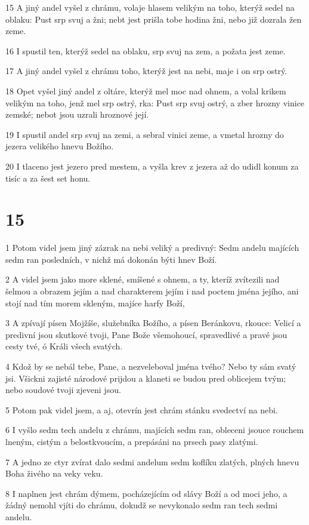 \par 15 A jiný andel vyšel z chrámu, volaje hlasem velikým na toho, kterýž sedel na oblaku: Pust srp svuj a žni; nebt jest prišla tobe hodina žni, nebo již dozrala žen zeme.
\par 16 I spustil ten, kterýž sedel na oblaku, srp svuj na zem, a požata jest zeme.
\par 17 A jiný andel vyšel z chrámu toho, kterýž jest na nebi, maje i on srp ostrý.
\par 18 Opet vyšel jiný andel z oltáre, kterýž mel moc nad ohnem, a volal krikem velikým na toho, jenž mel srp ostrý, rka: Pust srp svuj ostrý, a zber hrozny vinice zemské; nebot jsou uzrali hroznové její.
\par 19 I spustil andel srp svuj na zemi, a sebral vinici zeme, a vmetal hrozny do jezera velikého hnevu Božího.
\par 20 I tlaceno jest jezero pred mestem, a vyšla krev z jezera až do udidl konum za tisíc a za šest set honu.

\chapter{15}

\par 1 Potom videl jsem jiný zázrak na nebi veliký a predivný: Sedm andelu majících sedm ran posledních, v nichž má dokonán býti hnev Boží.
\par 2 A videl jsem jako more sklené, smíšené s ohnem, a ty, kteríž zvítezili nad šelmou a obrazem jejím a nad charakterem jejím i nad poctem jména jejího, ani stojí nad tím morem skleným, majíce harfy Boží,
\par 3 A zpívají písen Mojžíše, služebníka Božího, a písen Beránkovu, rkouce: Velicí a predivní jsou skutkové tvoji, Pane Bože všemohoucí, spravedlivé a pravé jsou cesty tvé, ó Králi všech svatých.
\par 4 Kdož by se nebál tebe, Pane, a nezveleboval jména tvého? Nebo ty sám svatý jsi. Všickni zajisté národové prijdou a klaneti se budou pred oblicejem tvým; nebo soudové tvoji zjeveni jsou.
\par 5 Potom pak videl jsem, a aj, otevrín jest chrám stánku svedectví na nebi.
\par 6 I vyšlo sedm tech andelu z chrámu, majících sedm ran, obleceni jsouce rouchem lneným, cistým a belostkvoucím, a prepásáni na prsech pasy zlatými.
\par 7 A jedno ze ctyr zvírat dalo sedmi andelum sedm koflíku zlatých, plných hnevu Boha živého na veky veku.
\par 8 I naplnen jest chrám dýmem, pocházejícím od slávy Boží a od moci jeho, a žádný nemohl vjíti do chrámu, dokudž se nevykonalo sedm ran tech sedmi andelu.

